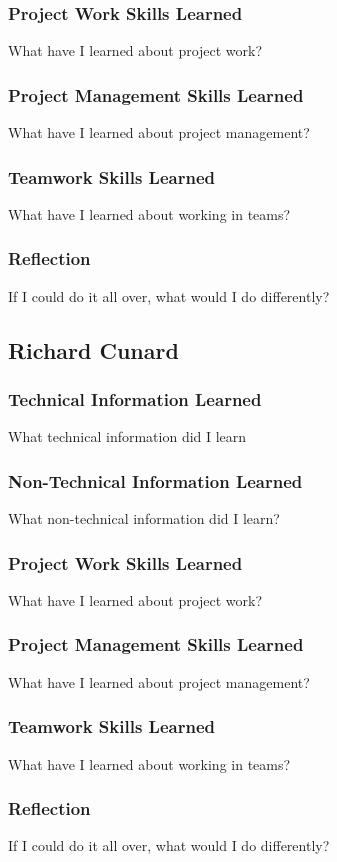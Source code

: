 \documentclass[onecolumn, draftclsnofoot,10pt, compsoc]{IEEEtran}
\begin{document}
\subsubsection{Project Work Skills Learned}
What have I learned about project work?
\subsubsection{Project Management Skills Learned}
What have I learned about project management?
\subsubsection{Teamwork Skills Learned}
What have I learned about working in teams?
\subsubsection{Reflection}
If I could do it all over, what would I do differently?


\subsection{Richard Cunard}

\subsubsection{Technical Information Learned}
What technical information did I learn
\subsubsection{Non-Technical Information Learned}
What non-technical information did I learn?
\subsubsection{Project Work Skills Learned}
What have I learned about project work?
\subsubsection{Project Management Skills Learned}
What have I learned about project management?
\subsubsection{Teamwork Skills Learned}
What have I learned about working in teams?
\subsubsection{Reflection}
If I could do it all over, what would I do differently?
\end{document}
